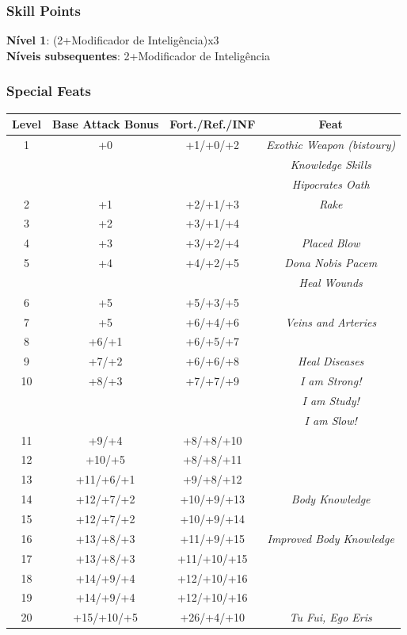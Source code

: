 \documentclass[ letterpaper,12pt]{article}
\begin{document}
\subsubsection{Skill Points}
{\bf Nível 1}: (2+Modificador de Inteligência)x3\\
{\bf Níveis subsequentes}: 2+Modificador de Inteligência\\

\subsubsection{Special Feats}

\begin{center} \begin{tabular}{|c||c|c|c|}
\hline
{\bf Level}&{\bf Base Attack Bonus}&{\bf Fort./Ref./INF}&{\bf Feat}\\
\hline
1&+0&+1/+0/+2&{\it Exothic Weapon (bistoury)}\\
&&&{\it Knowledge Skills}\\
&&&{\it Hipocrates Oath}\\
\hline
2&+1&+2/+1/+3&{\it Rake}\\
\hline
3&+2&+3/+1/+4&\\
\hline
4&+3&+3/+2/+4&{\it Placed Blow}\\
\hline
5&+4&+4/+2/+5&{\it Dona Nobis Pacem}\\
&&&{\it Heal Wounds}\\
\hline
6&+5&+5/+3/+5&\\
\hline
7&+5&+6/+4/+6&{\it Veins and Arteries}\\
\hline
8&+6/+1&+6/+5/+7&\\
\hline
9&+7/+2&+6/+6/+8&{\it Heal Diseases}\\
\hline
10&+8/+3&+7/+7/+9&{\it I am Strong!}\\
&&&{\it I am Study!}\\
&&&{\it I am Slow!}\\
\hline
11&+9/+4&+8/+8/+10&\\
\hline
12&+10/+5&+8/+8/+11&\\
\hline
13&+11/+6/+1&+9/+8/+12&\\
\hline
14&+12/+7/+2&+10/+9/+13&{\it Body Knowledge}\\
\hline
15&+12/+7/+2&+10/+9/+14&\\
\hline
16&+13/+8/+3&+11/+9/+15&{\it Improved Body Knowledge}\\
\hline
17&+13/+8/+3&+11/+10/+15&\\
\hline
18&+14/+9/+4&+12/+10/+16&\\
\hline
19&+14/+9/+4&+12/+10/+16&\\
\hline
20&+15/+10/+5&+26/+4/+10&{\it Tu Fui, Ego Eris}\\
\hline
\end{tabular} \end{center}
\end{document}
